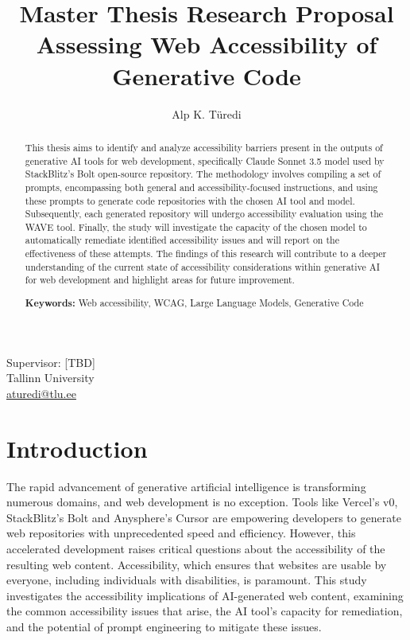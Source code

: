 \documentclass{article}
\title{%
  \textbf{Master Thesis Research Proposal}\\
  \vfill
  \textbf{Assessing Web Accessibility of Generative Code}
}
\author{Alp K. Türedi}
\begin{document}
\maketitle

{\centering
  Supervisor: [TBD]\\
  \vfill
  Tallinn University\\
  \href{mailto:aturedi@tlu.ee}{aturedi@tlu.ee}\\
}

\begin{abstract}
  This thesis aims to identify and analyze accessibility barriers present in the outputs of generative AI tools for web development,
  specifically Claude Sonnet 3.5 model used by StackBlitz's Bolt open-source repository.
  The methodology involves compiling a set of prompts, encompassing both general and accessibility-focused instructions,
  and using these prompts to generate code repositories with the chosen AI tool and model.
  Subsequently, each generated repository will undergo accessibility evaluation using the WAVE tool.
  Finally, the study will investigate the capacity of the chosen model to automatically remediate identified accessibility issues
  and will report on the effectiveness of these attempts.
  The findings of this research will contribute to a deeper understanding of the current state of accessibility considerations within generative AI
  for web development and highlight areas for future improvement.

  \vfill
  \textbf{Keywords:} Web accessibility, WCAG, Large Language Models, Generative Code
\end{abstract}


\section{Introduction}
The rapid advancement of generative artificial intelligence is transforming numerous domains, and web development is no exception.
Tools like Vercel's v0, StackBlitz's Bolt and Anysphere's Cursor are empowering developers to generate web repositories with unprecedented speed and efficiency.
However, this accelerated development raises critical questions about the accessibility of the resulting web content.
Accessibility, which ensures that websites are usable by everyone, including individuals with disabilities, is paramount.
This study investigates the accessibility implications of AI-generated web content, examining the common accessibility issues that arise,
the AI tool's capacity for remediation, and the potential of prompt engineering to mitigate these issues.
\end{document}
